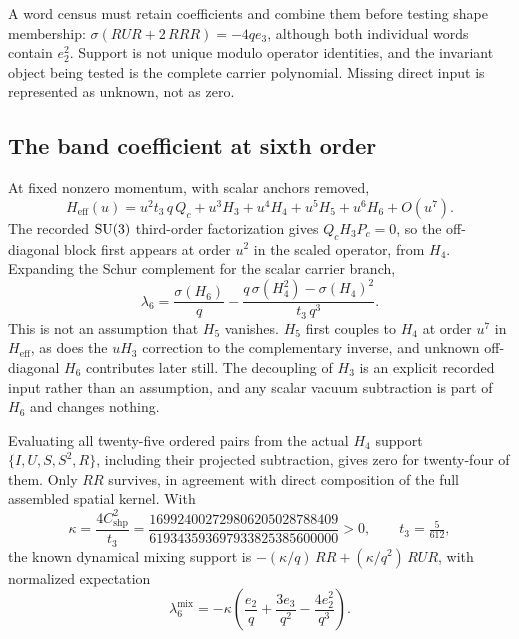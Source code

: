 A word census must retain coefficients and combine them before testing
shape membership: $\sigma(RUR + 2\,RRR) = -4q e_3$, although both
individual words contain $e_2^2$. Support is not unique modulo operator
identities, and the invariant object being tested is the complete
carrier polynomial. Missing direct input is represented as unknown, not
as zero.

\subsection{The band coefficient at sixth order}

At fixed nonzero momentum, with scalar anchors removed,
\begin{equation}
  H_{\mathrm{eff}}(u) = u^2 t_3\, q\, Q_c + u^3 H_3 + u^4 H_4
    + u^5 H_5 + u^6 H_6 + O(u^7).
\end{equation}
The recorded $\mathrm{SU}(3)$ third-order factorization gives
$Q_c H_3 P_c = 0$, so the off-diagonal block first appears at order
$u^2$ in the scaled operator, from $H_4$. Expanding the Schur complement
for the scalar carrier branch,
\begin{equation}
  \lambda_6 = \frac{\sigma(H_6)}{q}
    - \frac{q\,\sigma(H_4^2) - \sigma(H_4)^2}{t_3\, q^3}.
  \label{eq:S6}
\end{equation}
This is not an assumption that $H_5$ vanishes. $H_5$ first couples to
$H_4$ at order $u^7$ in $H_{\mathrm{eff}}$, as does the $uH_3$
correction to the complementary inverse, and unknown off-diagonal $H_6$
contributes later still. The decoupling of $H_3$ is an explicit recorded
input rather than an assumption, and any scalar vacuum subtraction is
part of $H_6$ and changes nothing.

Evaluating all twenty-five ordered pairs from the actual $H_4$ support
$\{I,U,S,S^2,R\}$, including their projected subtraction, gives zero for
twenty-four of them. Only $RR$ survives, in agreement with direct
composition of the full assembled spatial kernel. With
\begin{equation}
  \kappa = \frac{4C_{\mathrm{shp}}^2}{t_3}
  = \frac{169924002729806205028788409}{619343593697933825385600000} > 0,
  \qquad t_3 = \tfrac{5}{612},
\end{equation}
the known dynamical mixing support is
$-(\kappa/q)\,RR + (\kappa/q^2)\,RUR$, with normalized expectation
\begin{equation}
  \lambda_6^{\mathrm{mix}}
  = -\kappa\left(\frac{e_2}{q} + \frac{3e_3}{q^2}
      - \frac{4e_2^2}{q^3}\right).
\end{equation}

